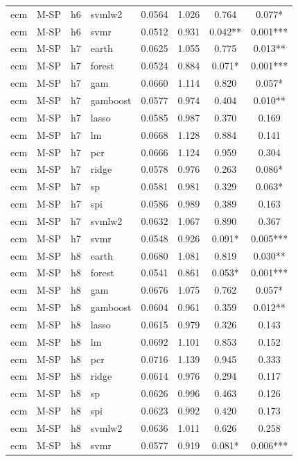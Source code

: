 \begin{ThreePartTable}
\begin{longtable}[t]{llclcccc}
ecm & M-SP & h6 & svmlw2 & 0.0564 & 1.026 & 0.764 & 0.077*\\
ecm & M-SP & h6 & svmr & 0.0512 & 0.931 & 0.042** & 0.001***\\
\addlinespace
ecm & M-SP & h7 & earth & 0.0625 & 1.055 & 0.775 & 0.013**\\
ecm & M-SP & h7 & forest & 0.0524 & 0.884 & 0.071* & 0.001***\\
ecm & M-SP & h7 & gam & 0.0660 & 1.114 & 0.820 & 0.057*\\
ecm & M-SP & h7 & gamboost & 0.0577 & 0.974 & 0.404 & 0.010**\\
ecm & M-SP & h7 & lasso & 0.0585 & 0.987 & 0.370 & 0.169\\
ecm & M-SP & h7 & lm & 0.0668 & 1.128 & 0.884 & 0.141\\
ecm & M-SP & h7 & pcr & 0.0666 & 1.124 & 0.959 & 0.304\\
ecm & M-SP & h7 & ridge & 0.0578 & 0.976 & 0.263 & 0.086*\\
ecm & M-SP & h7 & sp & 0.0581 & 0.981 & 0.329 & 0.063*\\
ecm & M-SP & h7 & spi & 0.0586 & 0.989 & 0.389 & 0.163\\
ecm & M-SP & h7 & svmlw2 & 0.0632 & 1.067 & 0.890 & 0.367\\
ecm & M-SP & h7 & svmr & 0.0548 & 0.926 & 0.091* & 0.005***\\
\addlinespace
ecm & M-SP & h8 & earth & 0.0680 & 1.081 & 0.819 & 0.030**\\
ecm & M-SP & h8 & forest & 0.0541 & 0.861 & 0.053* & 0.001***\\
ecm & M-SP & h8 & gam & 0.0676 & 1.075 & 0.762 & 0.057*\\
ecm & M-SP & h8 & gamboost & 0.0604 & 0.961 & 0.359 & 0.012**\\
ecm & M-SP & h8 & lasso & 0.0615 & 0.979 & 0.326 & 0.143\\
ecm & M-SP & h8 & lm & 0.0692 & 1.101 & 0.853 & 0.152\\
ecm & M-SP & h8 & pcr & 0.0716 & 1.139 & 0.945 & 0.333\\
ecm & M-SP & h8 & ridge & 0.0614 & 0.976 & 0.294 & 0.117\\
ecm & M-SP & h8 & sp & 0.0626 & 0.996 & 0.463 & 0.126\\
ecm & M-SP & h8 & spi & 0.0623 & 0.992 & 0.420 & 0.173\\
ecm & M-SP & h8 & svmlw2 & 0.0636 & 1.011 & 0.626 & 0.258\\
ecm & M-SP & h8 & svmr & 0.0577 & 0.919 & 0.081* & 0.006***\\

\end{longtable}
\end{ThreePartTable}
